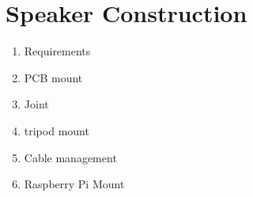 \chapter{Speaker Construction}

\begin{enumerate}
  \item Requirements
  \item PCB mount
  \item Joint
  \item tripod mount
  \item Cable management
  \item Raspberry Pi Mount
\end{enumerate}
